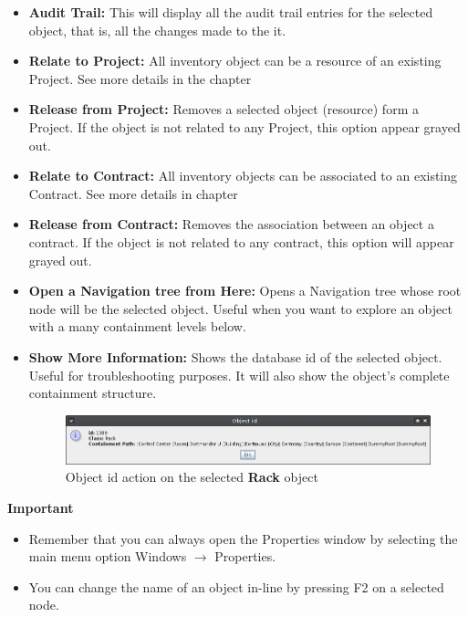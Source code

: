 \documentclass[a4paper]{article}
\begin{document}
\begin{itemize}
		\item \textbf{Audit Trail:} This will display all the audit trail entries for the selected object, that is, all the changes made to the it.
		\item \textbf{Relate to Project:} All inventory object can be a resource of an existing Project. See more details in the chapter 
		\item \textbf{Release from Project:} Removes a selected object (resource) form a Project. If the object is not related to any Project, this option appear grayed out.
		\item \textbf{Relate to Contract:} All inventory objects can be associated to an existing Contract. See more details in chapter 
		\item \textbf{Release from Contract:} Removes the association between an object a contract. If the object is not related to any contract, this option will appear grayed out.
		\item \textbf{Open a Navigation tree from Here:} Opens a Navigation tree whose root node will be the selected object. Useful when you want to explore an object with a many containment levels below.
		\item \textbf{Show More Information:} Shows the database id of the selected object. Useful for troubleshooting purposes. It will also show the object's complete containment structure.
			\begin{figure}[h!]
				\centering
				\includegraphics[width=\linewidth]{img/action_show_object_id.png}
				\caption{Object id action on the selected \textbf{Rack} object}
				\label{fig:action_show_object_id}
			\end{figure}
	\end{itemize}
	\begin{framed} {\large \textbf{Important}}
		\begin{itemize}
			\item Remember that you can always open the Properties window by selecting the main menu option Windows $\rightarrow$ Properties.
			\item You can change the name of an object in-line by pressing F2 on a selected node.
		\end{itemize}
	\end{framed}
\end{document}
